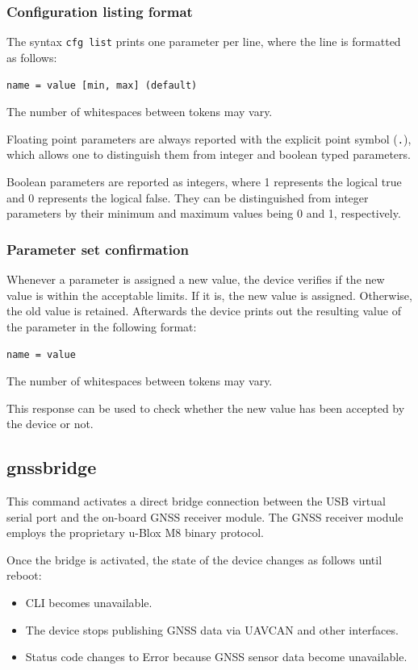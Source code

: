 \documentclass{zubaxdoc}
\begin{document}
\subsubsection{Configuration listing format}\label{sec:cli_cfg_listing}

The syntax \verb|cfg list| prints one parameter per line, where the line is formatted as follows:

\verb|name = value [min, max] (default)|

The number of whitespaces between tokens may vary.

Floating point parameters are always reported with the explicit point symbol (\verb|.|),
which allows one to distinguish them from integer and boolean typed parameters.

Boolean parameters are reported as integers, where 1 represents the logical true and 0 represents the logical false.
They can be distinguished from integer parameters by their minimum and maximum values being 0 and 1,
respectively.

\subsubsection{Parameter set confirmation}\label{sec:cli_cfg_set_confirmation}

Whenever a parameter is assigned a new value, the device verifies if the new value is within the
acceptable limits.
If it is, the new value is assigned. Otherwise, the old value is retained.
Afterwards the device prints out the resulting value of the parameter in the following format:

\verb|name = value|

The number of whitespaces between tokens may vary.

This response can be used to check whether the new value has been accepted by the device or not.

\subsection{gnssbridge}

This command activates a direct bridge connection between the USB virtual serial port and the on-board
GNSS receiver module.
The GNSS receiver module employs the proprietary u-Blox M8 binary protocol.

Once the bridge is activated, the state of the device changes as follows until reboot:
\begin{itemize}
    \item CLI becomes unavailable.
    \item The device stops publishing GNSS data via UAVCAN and other interfaces.
    \item Status code changes to Error because GNSS sensor data become unavailable.
\end{itemize}
\end{document}
